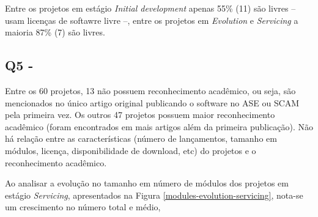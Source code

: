 Entre os projetos em estágio {\it Initial development} apenas 55\% (11) são
livres -- usam licenças de softawre livre --, entre os projetos em {\it
Evolution} e {\it Servicing} a maioria 87\% (7) são livres.

\subsection{Q5 - \QuestaoCinco} %

Entre os 60 projetos, 13 não possuem reconhecimento acadêmico, ou seja, são
mencionados no único artigo original publicando o software no ASE ou SCAM pela
primeira vez. Os outros 47 projetos possuem maior reconhecimento acadêmico
(foram encontrados em mais artigos além da primeira publicação). Não há relação
entre as características (número de lançamentos, tamanho em módulos, licença,
disponibilidade de download, etc) do projetos e o reconhecimento acadêmico.


Ao analisar a evolução no tamanho em número de módulos dos projetos em estágio
{\it Servicing}, apresentados na Figura \ref{modules-evolution-servicing},
nota-se um crescimento no número total e médio, 



